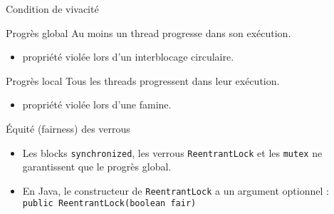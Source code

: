 \begin{frame}{Condition de vivacité}

  \begin{block}{Progrès global}
    \alert{Au moins un} thread progresse dans son exécution.
    \begin{itemize}
    \item propriété violée lors d'un interblocage circulaire.
    \end{itemize}
  \end{block}

  \begin{block}{Progrès local}
    \alert{Tous les threads} progressent dans leur exécution.
    \begin{itemize}
    \item propriété violée lors d'une famine.
    \end{itemize}
  \end{block}

\pause
  \begin{alertblock}{Équité (fairness) des verrous}
    \begin{itemize}
    \item Les blocks \lstinline{synchronized}, les verrous \lstinline{ReentrantLock} et les \lstinline{mutex} ne garantissent que le progrès global.
    \item En Java, le constructeur de \lstinline{ReentrantLock} a un argument optionnel :\\
      \lstinline{public ReentrantLock(boolean fair)}
    \end{itemize}
  \end{alertblock}
\end{frame}

